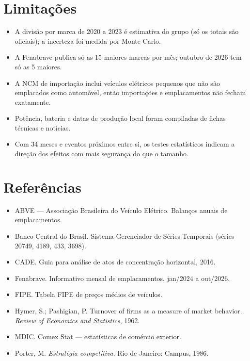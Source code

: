 \documentclass[11pt,a4paper]{article}
\begin{document}
\section{Limitações}
\begin{itemize}
  \item A divisão por marca de 2020 a 2023 é estimativa do grupo (só os totais são oficiais); a incerteza foi medida por Monte Carlo.
  \item A Fenabrave publica só as 15 maiores marcas por mês; outubro de 2026 tem só as 5 maiores.
  \item A NCM de importação inclui veículos elétricos pequenos que não são emplacados como automóvel, então importações e emplacamentos não fecham exatamente.
  \item Potência, bateria e datas de produção local foram compiladas de fichas técnicas e notícias.
  \item Com 34 meses e eventos próximos entre si, os testes estatísticos indicam a direção dos efeitos com mais segurança do que o tamanho.
\end{itemize}

\section*{Referências}
\small
\begin{itemize}
  \item ABVE --- Associação Brasileira do Veículo Elétrico. Balanços anuais de emplacamentos.
  \item Banco Central do Brasil. Sistema Gerenciador de Séries Temporais (séries 20749, 4189, 433, 3698).
  \item CADE. Guia para análise de atos de concentração horizontal, 2016.
  \item Fenabrave. Informativo mensal de emplacamentos, jan/2024 a out/2026.
  \item FIPE. Tabela FIPE de preços médios de veículos.
  \item Hymer, S.; Pashigian, P. Turnover of firms as a measure of market behavior. \emph{Review of Economics and Statistics}, 1962.
  \item MDIC. Comex Stat --- estatísticas de comércio exterior.
  \item Porter, M. \emph{Estratégia competitiva}. Rio de Janeiro: Campus, 1986.
\end{itemize}
\end{document}

